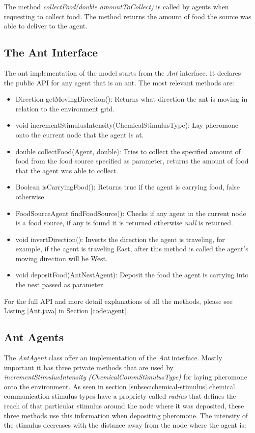 The method \emph{collectFood(double amountToCollect)} is called by agents when requesting to collect food. The method returns the amount of food the source was able to deliver to the agent.

\subsection{The Ant Interface}

The ant implementation of the model starts from the \emph{Ant} interface. It declares the public \ac{API} for any agent that is an ant. The most relevant methods are: 

\begin{itemize}
  \item Direction getMovingDirection(): Returns what direction the ant is moving in relation to the environment grid.
  \item void incrementStimulusIntensity(ChemicalStimulusType): Lay pheromone onto the current node that the agent is at.
  \item double collectFood(Agent, double): Tries to collect the specified amount of food from the food source specified as parameter, returns the amount of food that the agent was able to collect.
  \item Boolean isCarryingFood(): Returns true if the agent is carrying food, false otherwise.
  \item FoodSourceAgent findFoodSource(): Checks if any agent in the current node is a food source, if any is found it is returned otherwise \emph{null} is returned.
  \item void invertDirection(): Inverts the direction the agent is traveling, for example, if the agent is traveling East, after this method is called the agent's moving direction will be West.
  \item void depositFood(AntNestAgent): Deposit the food the agent is carrying into the nest passed as parameter.
\end{itemize}

For the full \ac{API} and more detail explanations of all the methods, please see Listing \ref{Ant.java} in Section \ref{code:agent}.

\subsection{Ant Agents}
\label{sec:pheromone-deposit}

The \emph{AntAgent} class offer an implementation of the \emph{Ant} interface. Mostly important it has three private methods that are used by \emph{incrementStimulusIntensity (ChemicalCommStimulusType)} for laying pheromone onto the environment. As seen in section \ref{subsec:chemical-stimulus} chemical communication stimulus types have a propriety called \emph{radius} that defines the reach of that particular stimulus around the node where it was deposited, these three methods use this information when depositing pheromone. The intensity of the stimulus decreases with the distance away from the node where the agent is:

